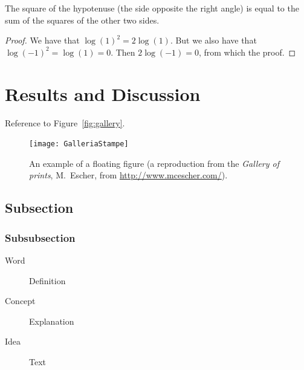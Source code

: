 \documentclass[
10pt, %
a4paper, %
oneside, %
headinclude,footinclude, %
BCOR5mm, %
]{scrartcl}
\begin{document}
\begin{theorem}[Pythagoras]
The square of the hypotenuse (the side opposite the right angle) is equal to the sum of the squares of the other two sides.
\end{theorem}

\begin{proof} 
We have that $\log(1)^2 = 2\log(1)$.
But we also have that $\log(-1)^2=\log(1)=0$.
Then $2\log(-1)=0$, from which the proof.
\end{proof}


\section{Results and Discussion}

Reference to Figure~\vref{fig:gallery}. %

\begin{figure}[tb]
\centering 
\texttt{[image: GalleriaStampe]} 
\caption[An example of a floating figure]{An example of a floating figure (a reproduction from the \emph{Gallery of prints}, M.~Escher, from \url{http://www.mcescher.com/}).} %
\label{fig:gallery} 
\end{figure}



\subsection{Subsection}


\subsubsection{Subsubsection}


\begin{description}
\item[Word] Definition
\item[Concept] Explanation
\item[Idea] Text
\end{description}
\end{document}
